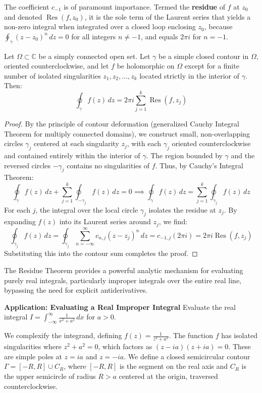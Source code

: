 The coefficient $c_{-1}$ is of paramount importance. Termed the \textbf{residue} of $f$ at $z_0$ and denoted $\operatorname{Res}(f, z_0)$, it is the sole term of the Laurent series that yields a non-zero integral when integrated over a closed loop enclosing $z_0$, because $\oint_\gamma (z - z_0)^n \, dz = 0$ for all integers $n \neq -1$, and equals $2\pi i$ for $n = -1$.

\begin{theorem}
Let $\Omega \subset \mathbb{C}$ be a simply connected open set. Let $\gamma$ be a simple closed contour in $\Omega$, oriented counterclockwise, and let $f$ be holomorphic on $\Omega$ except for a finite number of isolated singularities $z_1, z_2, \dots, z_k$ located strictly in the interior of $\gamma$. Then:
$$\oint_\gamma f(z) \, dz = 2\pi i \sum_{j=1}^k \operatorname{Res}(f, z_j)$$
\end{theorem}

\begin{proof}
By the principle of contour deformation (generalized Cauchy Integral Theorem for multiply connected domains), we construct small, non-overlapping circles $\gamma_j$ centered at each singularity $z_j$, with each $\gamma_j$ oriented counterclockwise and contained entirely within the interior of $\gamma$. The region bounded by $\gamma$ and the reversed circles $-\gamma_j$ contains no singularities of $f$. Thus, by Cauchy's Integral Theorem:
$$\oint_\gamma f(z) \, dz + \sum_{j=1}^k \oint_{-\gamma_j} f(z) \, dz = 0 \implies \oint_\gamma f(z) \, dz = \sum_{j=1}^k \oint_{\gamma_j} f(z) \, dz$$
For each $j$, the integral over the local circle $\gamma_j$ isolates the residue at $z_j$. By expanding $f(z)$ into its Laurent series around $z_j$, we find:
$$\oint_{\gamma_j} f(z) \, dz = \oint_{\gamma_j} \sum_{n=-\infty}^\infty c_{n,j} (z - z_j)^n \, dz = c_{-1,j} (2\pi i) = 2\pi i \operatorname{Res}(f, z_j)$$
Substituting this into the contour sum completes the proof.
\end{proof}

The Residue Theorem provides a powerful analytic mechanism for evaluating purely real integrals, particularly improper integrals over the entire real line, bypassing the need for explicit antiderivatives.

\textbf{Application: Evaluating a Real Improper Integral}
Evaluate the real integral $I = \int_{-\infty}^\infty \frac{1}{x^2 + a^2} \, dx$ for $a > 0$.

We complexify the integrand, defining $f(z) = \frac{1}{z^2 + a^2}$. The function $f$ has isolated singularities where $z^2 + a^2 = 0$, which factors as $(z - ia)(z + ia) = 0$. These are simple poles at $z = ia$ and $z = -ia$. We define a closed semicircular contour $\Gamma = [-R, R] \cup C_R$, where $[-R, R]$ is the segment on the real axis and $C_R$ is the upper semicircle of radius $R > a$ centered at the origin, traversed counterclockwise.

